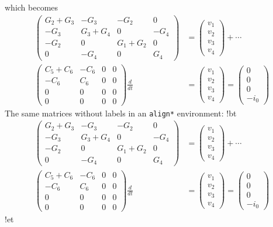 \documentclass[%
oneside,                 %
final,                   %
10pt]{article}
\begin{document}
which becomes
\begin{align}
\begin{pmatrix}
G_2 + G_3 & -G_3 & -G_2 & 0 \\ 
-G_3 & G_3 + G_4 & 0 & -G_4 \\ 
-G_2 & 0 & G_1 + G_2 & 0 \\ 
0 & -G_4 & 0 & G_4
\end{pmatrix}
&=
\begin{pmatrix}
v_1 \\ 
v_2 \\ 
v_3 \\ 
v_4
\end{pmatrix}
+ \cdots
\label{_mymatrixeq}\\ 
\begin{pmatrix}
C_5 + C_6 & -C_6 & 0 & 0 \\ 
-C_6 & C_6 & 0 & 0 \\ 
0 & 0 & 0 & 0 \\ 
0 & 0 & 0 & 0
\end{pmatrix}
\frac{d}{dt} &=
\begin{pmatrix}
v_1 \\ 
v_2 \\ 
v_3 \\ 
v_4
\end{pmatrix} =
\begin{pmatrix}
0 \\ 
0 \\ 
0 \\ 
-i_0
\end{pmatrix}
\end{align}
The same matrices without labels in an \texttt{align*} environment:
\blatexcod
!bt
\begin{align*}
\begin{pmatrix}
G_2 + G_3 & -G_3 & -G_2 & 0 \\ 
-G_3 & G_3 + G_4 & 0 & -G_4 \\ 
-G_2 & 0 & G_1 + G_2 & 0 \\ 
0 & -G_4 & 0 & G_4
\end{pmatrix}
&=
\begin{pmatrix}
v_1 \\ 
v_2 \\ 
v_3 \\ 
v_4
\end{pmatrix}
+ \cdots \\ 
\begin{pmatrix}
C_5 + C_6 & -C_6 & 0 & 0 \\ 
-C_6 & C_6 & 0 & 0 \\ 
0 & 0 & 0 & 0 \\ 
0 & 0 & 0 & 0
\end{pmatrix}
\frac{d}{dt} &=
\begin{pmatrix}
v_1 \\ 
v_2 \\ 
v_3 \\ 
v_4
\end{pmatrix} =
\begin{pmatrix}
0 \\ 
0 \\ 
0 \\ 
-i_0
\end{pmatrix}
\end{align*}
!et
\end{document}

